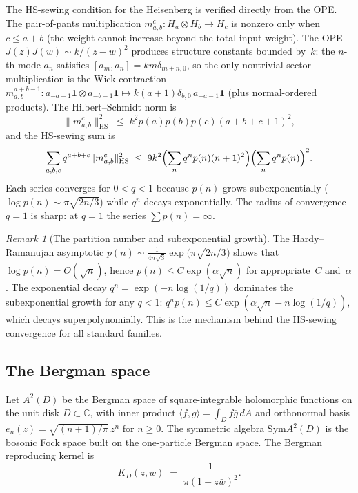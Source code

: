 \documentclass[11pt,reqno]{amsart}
\theoremstyle{definition}
\theoremstyle{remark}
\newtheorem{remark}[theorem]{Remark}
\newcommand{\bC}{\mathbb{C}}
\newcommand{\Sym}{\mathrm{Sym}}
\newcommand{\HS}{\mathrm{HS}}
\numberwithin{equation}{section}
\begin{document}
The HS-sewing condition for the Heisenberg is verified
directly from the OPE.  The pair-of-pants multiplication
$m_{a,b}^c \colon H_a \otimes H_b \to H_c$ is nonzero
only when $c \leq a + b$ (the weight cannot increase beyond
the total input weight).  The OPE
$J(z)J(w) \sim k/(z-w)^2$ produces structure constants
bounded by~$k$: the $n$-th mode $a_n$ satisfies
$[a_m, a_n] = km\delta_{m+n,0}$, so the only nontrivial
sector multiplication is the Wick contraction
$m_{a,b}^{a+b-1} \colon
a_{-a-1}\mathbf{1} \otimes a_{-b-1}\mathbf{1}
\mapsto k(a+1)\delta_{b,0}\,a_{-a-1}\mathbf{1}$
(plus normal-ordered products).  The Hilbert--Schmidt norm
is
\[
\|m_{a,b}^c\|_{\HS}^2
\;\leq\;
k^2 p(a)p(b)p(c)(a+b+c+1)^2,
\]
and the HS-sewing sum is
\[
\sum_{a,b,c} q^{a+b+c}\|m_{a,b}^c\|_{\HS}^2
\;\leq\;
9k^2\Bigl(\sum_n q^n p(n)(n+1)^2\Bigr)
\Bigl(\sum_n q^n p(n)\Bigr)^2.
\]
Each series converges for $0 < q < 1$ because $p(n)$ grows
subexponentially ($\log p(n) \sim \pi\sqrt{2n/3}$) while
$q^n$ decays exponentially.  The radius of convergence
$q = 1$ is sharp: at $q = 1$ the series $\sum p(n) = \infty$.

\begin{remark}[The partition number and subexponential growth]
\label{rem:partition-growth}
The Hardy--Ramanujan asymptotic
$p(n) \sim \frac{1}{4n\sqrt{3}}
\exp\bigl(\pi\sqrt{2n/3}\bigr)$
shows that $\log p(n) = O(\sqrt{n})$, hence
$p(n) \leq C\exp(\alpha\sqrt{n})$ for appropriate~$C$
and~$\alpha$.  The exponential decay
$q^n = \exp(-n\log(1/q))$ dominates the subexponential
growth for any $q < 1$:
$q^n p(n) \leq C\exp(\alpha\sqrt{n} - n\log(1/q))$,
which decays superpolynomially.  This is the mechanism behind
the HS-sewing convergence for all standard families.
\end{remark}

\subsection{The Bergman space}\label{subsec:bergman}

Let $A^2(D)$ be the Bergman space of square-integrable
holomorphic functions on the unit disk
$D \subset \bC$, with inner product
$\langle f, g \rangle = \int_D f\overline{g}\,dA$ and
orthonormal basis
$e_n(z) = \sqrt{(n+1)/\pi}\,z^n$ for $n \geq 0$.
The symmetric algebra $\Sym A^2(D)$ is the bosonic Fock space
built on the one-particle Bergman space.  The Bergman
reproducing kernel is
\begin{equation}\label{eq:bergman-kernel}
K_D(z,w)
\;=\;
\frac{1}{\pi(1 - z\bar w)^2}.
\end{equation}
\end{document}
